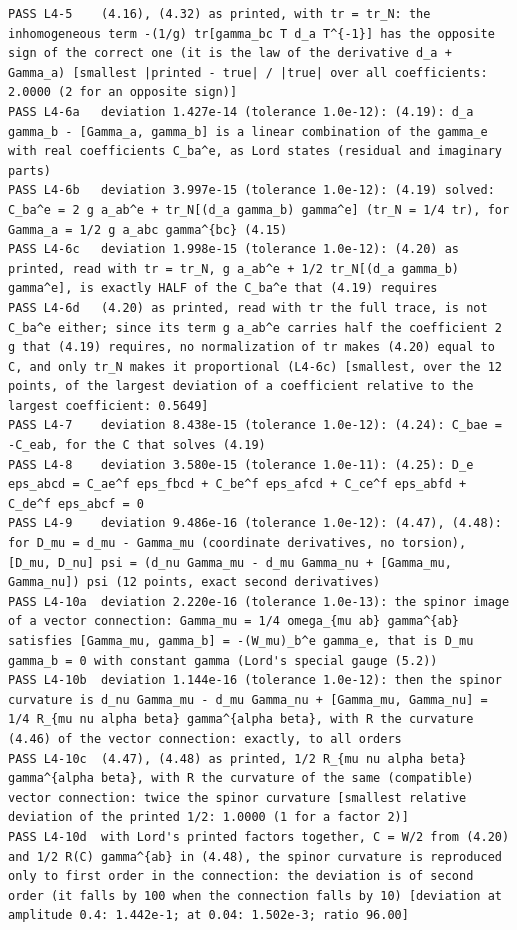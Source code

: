 \documentclass[
  10pt,
]{article}
\begin{document}
\begin{verbatim}
PASS L4-5    (4.16), (4.32) as printed, with tr = tr_N: the inhomogeneous term -(1/g) tr[gamma_bc T d_a T^{-1}] has the opposite sign of the correct one (it is the law of the derivative d_a + Gamma_a) [smallest |printed - true| / |true| over all coefficients: 2.0000 (2 for an opposite sign)]
PASS L4-6a   deviation 1.427e-14 (tolerance 1.0e-12): (4.19): d_a gamma_b - [Gamma_a, gamma_b] is a linear combination of the gamma_e with real coefficients C_ba^e, as Lord states (residual and imaginary parts)
PASS L4-6b   deviation 3.997e-15 (tolerance 1.0e-12): (4.19) solved: C_ba^e = 2 g a_ab^e + tr_N[(d_a gamma_b) gamma^e] (tr_N = 1/4 tr), for Gamma_a = 1/2 g a_abc gamma^{bc} (4.15)
PASS L4-6c   deviation 1.998e-15 (tolerance 1.0e-12): (4.20) as printed, read with tr = tr_N, g a_ab^e + 1/2 tr_N[(d_a gamma_b) gamma^e], is exactly HALF of the C_ba^e that (4.19) requires
PASS L4-6d   (4.20) as printed, read with tr the full trace, is not C_ba^e either; since its term g a_ab^e carries half the coefficient 2 g that (4.19) requires, no normalization of tr makes (4.20) equal to C, and only tr_N makes it proportional (L4-6c) [smallest, over the 12 points, of the largest deviation of a coefficient relative to the largest coefficient: 0.5649]
PASS L4-7    deviation 8.438e-15 (tolerance 1.0e-12): (4.24): C_bae = -C_eab, for the C that solves (4.19)
PASS L4-8    deviation 3.580e-15 (tolerance 1.0e-11): (4.25): D_e eps_abcd = C_ae^f eps_fbcd + C_be^f eps_afcd + C_ce^f eps_abfd + C_de^f eps_abcf = 0
PASS L4-9    deviation 9.486e-16 (tolerance 1.0e-12): (4.47), (4.48): for D_mu = d_mu - Gamma_mu (coordinate derivatives, no torsion), [D_mu, D_nu] psi = (d_nu Gamma_mu - d_mu Gamma_nu + [Gamma_mu, Gamma_nu]) psi (12 points, exact second derivatives)
PASS L4-10a  deviation 2.220e-16 (tolerance 1.0e-13): the spinor image of a vector connection: Gamma_mu = 1/4 omega_{mu ab} gamma^{ab} satisfies [Gamma_mu, gamma_b] = -(W_mu)_b^e gamma_e, that is D_mu gamma_b = 0 with constant gamma (Lord's special gauge (5.2))
PASS L4-10b  deviation 1.144e-16 (tolerance 1.0e-12): then the spinor curvature is d_nu Gamma_mu - d_mu Gamma_nu + [Gamma_mu, Gamma_nu] = 1/4 R_{mu nu alpha beta} gamma^{alpha beta}, with R the curvature (4.46) of the vector connection: exactly, to all orders
PASS L4-10c  (4.47), (4.48) as printed, 1/2 R_{mu nu alpha beta} gamma^{alpha beta}, with R the curvature of the same (compatible) vector connection: twice the spinor curvature [smallest relative deviation of the printed 1/2: 1.0000 (1 for a factor 2)]
PASS L4-10d  with Lord's printed factors together, C = W/2 from (4.20) and 1/2 R(C) gamma^{ab} in (4.48), the spinor curvature is reproduced only to first order in the connection: the deviation is of second order (it falls by 100 when the connection falls by 10) [deviation at amplitude 0.4: 1.442e-1; at 0.04: 1.502e-3; ratio 96.00]

\end{verbatim}
\end{document}
